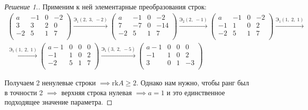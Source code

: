 \documentclass[a4paper]{article}
\theoremstyle{remark}
\newcommand{\arron}[3]{%
  \ensuremath{\xrightarrow{\text{Э}_1(#1,\; #2,\; #3)}}%
}
\newcommand{\arrtw}[2]{%
  \ensuremath{\xrightarrow{\text{Э}_2(#1,\; #2)}}%
}
\begin{document}
\begin{proof}[Решение 1.]
            Применим к ней элементарные преобразования строк: 
            \begin{multline*}
                \begin{pmatrix}
                    a & -1 & 0 & -2 \\ 
                    3 & 3 & 2 & 0 \\ 
                    -2 & 5 & 1 & 7 \\ 
                \end{pmatrix} 
                \arron{2}{3}{-2}
                \begin{pmatrix}
                    a & -1 & 0 & -2 \\ 
                    7 & -7 & 0 & -14 \\ 
                    -2 & 5 & 1 & 7 \\ 
                \end{pmatrix}
                \arrtw{2}{-1}
                \begin{pmatrix}
                    a & -1 & 0 & -2 \\ 
                    -1 & 1 & 0 & 2 \\ 
                    -2 & 5 & 1 & 7 \\ 
                \end{pmatrix}
                \arron{1}{2}{1}\\
                \arron{1}{2}{1}
                \begin{pmatrix}
                    a-1 & 0 & 0 & 0 \\ 
                    -1 & 1 & 0 & 2 \\ 
                    -2 & 5 & 1 & 7 \\ 
                \end{pmatrix}
                \arron{3}{2}{-5}
                \begin{pmatrix}
                    a-1 & 0 & 0 & 0 \\ 
                    -1 & 1 & 0 & 2 \\ 
                    3 & 0 & 1 & -3 \\ 
                \end{pmatrix}
            \end{multline*}

            Получаем 2 ненулевые строки $\implies \text{rk}A \geqslant 2$. Однако нам нужно, 
            чтобы ранг был в точности 2 $\implies$ верхняя строка нулевая $\implies a = 1$ и это 
            единственное подходящее значение параметра.


\end{proof}
\end{document}
